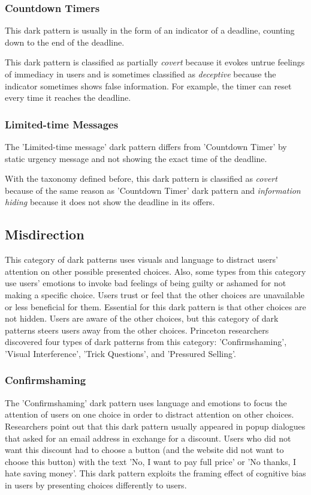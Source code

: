         \subsubsection*{Countdown Timers}
        This dark pattern is usually in the form of an indicator of a deadline, counting down to the end of the deadline. 
        
        This dark pattern is classified as partially \emph{covert} because it evokes untrue feelings of immediacy in users and is sometimes classified as \emph{deceptive} because the indicator sometimes shows false information. For example, the timer can reset every time it reaches the deadline.

        \subsubsection*{Limited-time Messages}
        The 'Limited-time message' dark pattern differs from 'Countdown Timer' by static urgency message and not showing the exact time of the deadline. 
        
        With the taxonomy defined before, this dark pattern is classified as \emph{covert} because of the same reason as 'Countdown Timer' dark pattern and \emph{information hiding} because it does not show the deadline in its offers.
    \subsection{Misdirection}
    This category of dark patterns uses visuals and language to distract users' attention on other possible presented choices. Also, some types from this category use users' emotions to invoke bad feelings of being guilty or ashamed for not making a specific choice. Users trust or feel that the other choices are unavailable or less beneficial for them. Essential for this dark pattern is that other choices are not hidden. Users are aware of the other choices, but this category of dark patterns steers users away from the other choices. Princeton researchers discovered four types of dark patterns from this category: 'Confirmshaming', 'Visual Interference', 'Trick Questions', and 'Pressured Selling'.
        \subsubsection*{Confirmshaming}
        The 'Confirmshaming' dark pattern uses language and emotions to focus the attention of users on one choice in order to distract attention on other choices. Researchers point out that this dark pattern usually appeared in popup dialogues that asked for an email address in exchange for a discount. Users who did not want this discount had to choose a button (and the website did not want to choose this button) with the text 'No, I want to pay full price' or 'No thanks, I hate saving money'. This dark pattern exploits the framing effect of cognitive bias in users by presenting choices differently to users.
        
